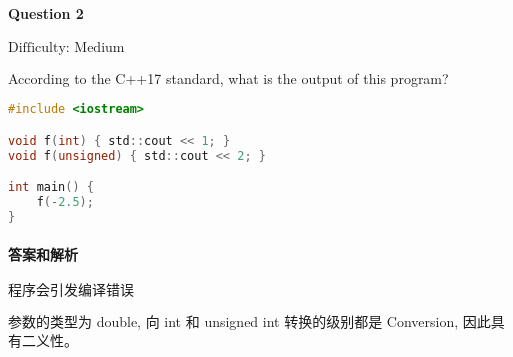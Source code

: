\documentclass{article}
\begin{document}
	\paragraph*{Question 2} $\boxed{\text{Difficulty: Medium}}$
	
	According to the C++17 standard, what is the output of this program?
	
	\begin{lstlisting}[language=C]  		
#include <iostream>

void f(int) { std::cout << 1; }
void f(unsigned) { std::cout << 2; }

int main() {
	f(-2.5);
}
	\end{lstlisting}
	
	
	\paragraph*{答案和解析} $\boxed{\text{程序会引发编译错误}} $
	
	参数的类型为 double, 向 int 和 unsigned int 转换的级别都是 Conversion, 因此具有二义性。
\end{document}
